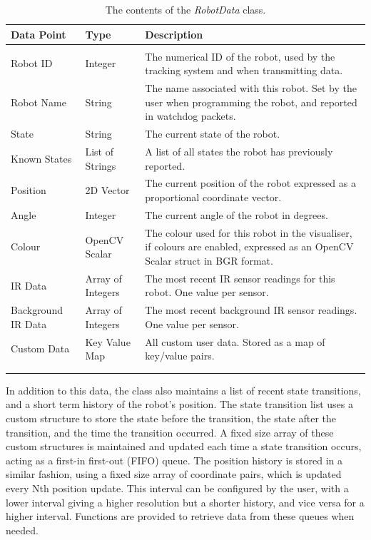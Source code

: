 \begin{longtable}{ l l p{8cm} }
\caption[Robot Data Contents]{The contents of the \textit{RobotData} class.}\\
 \hline
 Data Point & Type & Description\\
 \hline\\
 Robot ID & Integer & The numerical ID of the robot, used by the tracking system and when transmitting data.\\
 Robot Name & String & The name associated with this robot. Set by the user when programming the robot, and reported in watchdog packets. \\
 State & String & The current state of the robot. \\
 Known States & List of Strings & A list of all states the robot has previously reported. \\
 Position & 2D Vector & The current position of the robot expressed as a proportional coordinate vector. \\
 Angle & Integer & The current angle of the robot in degrees. \\
 Colour & OpenCV Scalar & The colour used for this robot in the visualiser, if colours are enabled, expressed as an OpenCV Scalar struct in BGR format. \\
 IR Data & Array of Integers & The most recent IR sensor readings for this robot. One value per sensor. \\
 Background IR Data & Array of Integers & The most recent background IR sensor readings. One value per sensor. \\
 Custom Data & Key Value Map & All custom user data. Stored as a map of key/value pairs. \\
 \bottomrule\\
 \label{tab:RobotDataContents}
\end{longtable}

In addition to this data, the class also maintains a list of recent state transitions, and a short term history of the robot's position. The state transition list uses a custom structure to store the state before the transition, the state after the transition, and the time the transition occurred. A fixed size array of these custom structures is maintained and updated each time a state transition occurs, acting as a first-in first-out (FIFO) queue. The position history is stored in a similar fashion, using a fixed size array of coordinate pairs, which is updated every Nth position update. This interval can be configured by the user, with a lower interval giving a higher resolution but a shorter history, and vice versa for a higher interval. Functions are provided to retrieve data from these queues when needed.

